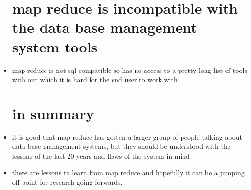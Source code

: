 \documentclass{article}
\begin{document}
\begin{itemize}
\section{map reduce is incompatible with the data base management system tools}
\item map reduce is not sql compatible so has no access to a pretty long list of tools with out which it is hard for the end user to work with 
\section{in summary}
\item it is good that map reduce has gotten a larger group of people talking about data base management systems, but they should be understood with the lessons of the last 20 years and flaws of the system in mind
\item there are lessons to learn from map reduce and hopefully it can be a jumping off point for research going forwards. 
\end{itemize}
\end{document}
